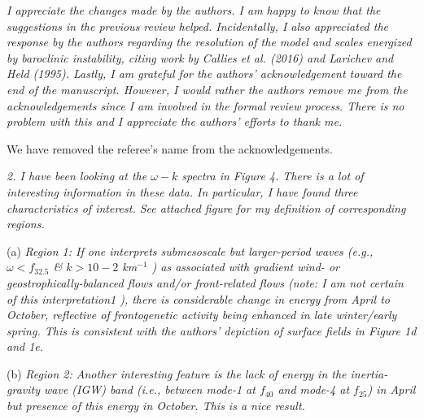 \documentclass[11pt]{article}
\newcommand{\bdp}{\begin{description}}
\newcommand{\edp}{\end{description}}
\begin{document}
\begin{enumerate}
 \item {\it I appreciate the changes made by the authors. I am happy to know that the suggestions in
the previous review helped. Incidentally, I also appreciated the response by the authors
regarding the resolution of the model and scales energized by baroclinic instability, citing
work by Callies et al. (2016) and Larichev and Held (1995). Lastly, I am grateful for the
authors’ acknowledgement toward the end of the manuscript. However, I would rather the
authors remove me from the acknowledgements since I am involved in the formal review
process. There is no problem with this and I appreciate the authors’ efforts to thank me.}

\bdp
   \item We have removed the referee's name from the acknowledgements.
\edp

\item {\it 2. I have been looking at the $\omega-k$ spectra in Figure 4. There is a lot of interesting
information in these data. In particular, I have found three characteristics of interest. See
attached figure for my definition of corresponding regions.}

    \subitem (a) {\it Region 1: If one interprets submesoscale but larger-period waves (e.g., $\omega < f_{32.5}$ \& $k >
10-2$ km$^{-1}$
) as associated with gradient wind- or geostrophically-balanced flows and/or
front-related flows (note: I am not certain of this interpretation1
), there is considerable
change in energy from April to October, reflective of frontogenetic activity being
enhanced in late winter/early spring. This is consistent with the authors’ depiction of
surface fields in Figure 1d and 1e.}

  \subitem (b) {\it Region 2: Another interesting feature is the lack of energy in the inertia-gravity wave
(IGW) band (i.e., between mode-1 at $f_{40}$ and mode-4 at $f_{25}$) in April but presence of
this energy in October. This is a nice result.}


\end{enumerate}
\end{document}
